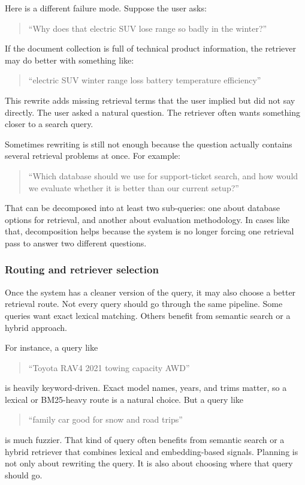 \documentclass[12pt]{article}
\begin{document}
Here is a different failure mode. Suppose the user asks:
\begin{quote}
``Why does that electric SUV lose range so badly in the winter?''
\end{quote}
If the document collection is full of technical product information, the
retriever may do better with something like:
\begin{quote}
``electric SUV winter range loss battery temperature efficiency''
\end{quote}
This rewrite adds missing retrieval terms that the user implied but did
not say directly. The user asked a natural question. The retriever often
wants something closer to a search query.

Sometimes rewriting is still not enough because the question actually
contains several retrieval problems at once. For example:
\begin{quote}
``Which database should we use for support-ticket search, and how would
we evaluate whether it is better than our current setup?''
\end{quote}
That can be decomposed into at least two sub-queries: one about database
options for retrieval, and another about evaluation methodology. In cases
like that, decomposition helps because the system is no longer forcing one
retrieval pass to answer two different questions.

\subsubsection{Routing and retriever selection}

Once the system has a cleaner version of the query, it may also choose a
better retrieval route. Not every query should go through the same
pipeline. Some queries want exact lexical matching. Others benefit from
semantic search or a hybrid approach.

For instance, a query like
\begin{quote}
``Toyota RAV4 2021 towing capacity AWD''
\end{quote}
is heavily keyword-driven. Exact model names, years, and trims matter, so
a lexical or BM25-heavy route is a natural choice. But a query like
\begin{quote}
``family car good for snow and road trips''
\end{quote}
is much fuzzier. That kind of query often benefits from semantic search
or a hybrid retriever that combines lexical and embedding-based signals.
Planning is not only about rewriting the query. It is also about choosing
where that query should go.
\end{document}
